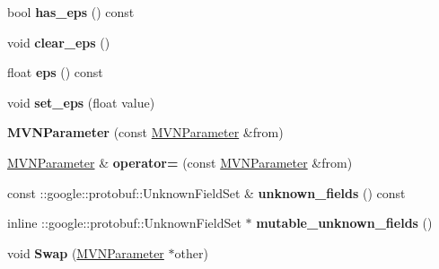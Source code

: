 \begin{DoxyCompactItemize}
bool {\bfseries has\+\_\+eps} () const
\item 
\mbox{\label{classcaffe_1_1_m_v_n_parameter_acc8f0ce43c0f328dd7a94704e9589c50}} 
void {\bfseries clear\+\_\+eps} ()
\item 
\mbox{\label{classcaffe_1_1_m_v_n_parameter_ab34d24cea6da4fb66e104d1bd0f8bcdf}} 
float {\bfseries eps} () const
\item 
\mbox{\label{classcaffe_1_1_m_v_n_parameter_a59b2af73b2cf0bb0aa3267da650cd59a}} 
void {\bfseries set\+\_\+eps} (float value)
\item 
\mbox{\label{classcaffe_1_1_m_v_n_parameter_a4579c80316129d1232af0f5ca2d06f5c}} 
{\bfseries M\+V\+N\+Parameter} (const \mbox{\hyperlink{classcaffe_1_1_m_v_n_parameter}{M\+V\+N\+Parameter}} \&from)
\item 
\mbox{\label{classcaffe_1_1_m_v_n_parameter_a888324b35a29f9fdf651567f3f40bdf6}} 
\mbox{\hyperlink{classcaffe_1_1_m_v_n_parameter}{M\+V\+N\+Parameter}} \& {\bfseries operator=} (const \mbox{\hyperlink{classcaffe_1_1_m_v_n_parameter}{M\+V\+N\+Parameter}} \&from)
\item 
\mbox{\label{classcaffe_1_1_m_v_n_parameter_ab866a8270f2003a9e3025a49bf042b5f}} 
const \+::google\+::protobuf\+::\+Unknown\+Field\+Set \& {\bfseries unknown\+\_\+fields} () const
\item 
\mbox{\label{classcaffe_1_1_m_v_n_parameter_ab86ebabbecf0521d5b5f0dc618c1fb63}} 
inline \+::google\+::protobuf\+::\+Unknown\+Field\+Set $\ast$ {\bfseries mutable\+\_\+unknown\+\_\+fields} ()
\item 
\mbox{\label{classcaffe_1_1_m_v_n_parameter_a4e171bae257670587b9a696b102613ab}} 
void {\bfseries Swap} (\mbox{\hyperlink{classcaffe_1_1_m_v_n_parameter}{M\+V\+N\+Parameter}} $\ast$other)
\item 
\mbox{\label{classcaffe_1_1_m_v_n_parameter_a5ff755a1ef05334114ca1a64e3f49f9a}} 

\end{DoxyCompactItemize}
